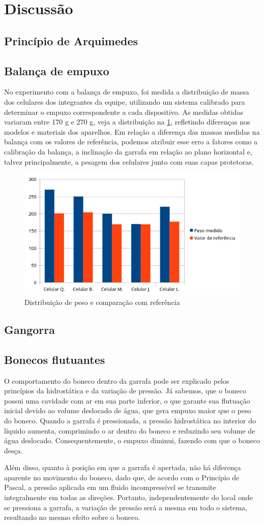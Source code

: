 \section{Discussão}
\subsection{Princípio de Arquimedes}

\subsection{Balança de empuxo}
No experimento com a balança de empuxo, foi medida a distribuição de massa dos
celulares dos integrantes da equipe, utilizando um sistema calibrado para
determinar o empuxo correspondente a cada dispositivo. As medidas obtidas
variaram entre 170 g e 270 g, veja a distribuição na \cref{pesos}, refletindo
diferenças nos modelos e materiais dos
aparelhos. Em relação a diferença das massas medidas na balança com os valores
de referência, podemos atribuir esse erro a fatores como a calibração da
balança, a inclinação da garrafa em relação ao plano horizontal e, talvez
principalmente, a pesagem dos celulares junto com suas capas protetoras.
\begin{figure}[H]
    \centering
    \includegraphics[width=.5\linewidth]{fig/pesos.png}
    \caption{Distribuição de peso e comparação com referência}
    \label{pesos}
\end{figure}
\subsection{Gangorra}

\subsection{Bonecos flutuantes}
O comportamento do boneco dentro da garrafa pode ser explicado pelos princípios
da hidrostática e da variação de pressão. Já sabemos, que o boneco possui uma
cavidade com ar em sua parte inferior, o que garante sua flutuação inicial
devido ao volume deslocado de água, que gera empuxo maior que o peso do boneco.
Quando a garrafa é pressionada, a pressão hidrostática no interior do líquido
aumenta, comprimindo o ar dentro do boneco e reduzindo seu volume de água
deslocado. Consequentemente, o empuxo diminui, fazendo com que o boneco desça.

Além disso, quanto à posição em que a garrafa é apertada, não há diferença
aparente no movimento do boneco, dado que, de acordo com o Princípio de Pascal,
a pressão aplicada em um fluido incompressível se transmite integralmente em
todas as direções. Portanto, independentemente do local onde se pressiona a
garrafa, a variação de pressão será a mesma em todo o sistema, resultando no
mesmo efeito sobre o boneco.
